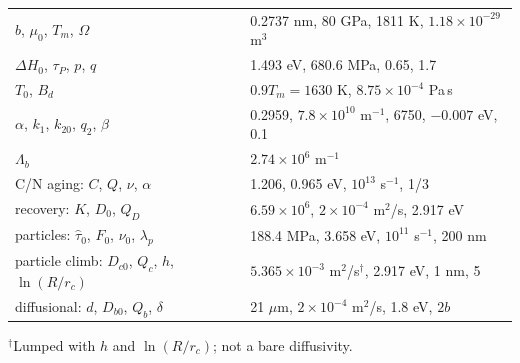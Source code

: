 \documentclass[11pt]{article}
\numberwithin{equation}{section}
\begin{document}
\begin{matbox}
\medskip
\begin{tabular}{@{}ll@{}}
\toprule
$b$, $\mu_0$, $T_m$, $\Omega$ & 0.2737 nm, 80 GPa, 1811 K, $1.18\times10^{-29}$ m$^3$\\
$\Delta H_0$, $\tau_P$, $p$, $q$ & 1.493 eV, 680.6 MPa, 0.65, 1.7\\
$T_0$, $B_d$ & $0.9T_m=1630$ K, $8.75\times10^{-4}$ Pa\,s\\
$\alpha$, $k_1$, $k_{20}$, $q_2$, $\beta$ & 0.2959, $7.8\times10^{10}$ m$^{-1}$, 6750, $-0.007$ eV, 0.1\\
$\Lambda_b$ & $2.74\times10^6$ m$^{-1}$\\
C/N aging: $C$, $Q$, $\nu$, $\alpha$ & 1.206, 0.965 eV, $10^{13}$ s$^{-1}$, 1/3\\
recovery: $K$, $D_0$, $Q_D$ & $6.59\times10^6$, $2\times10^{-4}$ m$^2$/s, 2.917 eV\\
particles: $\hat\tau_0$, $F_0$, $\nu_0$, $\lambda_p$ & 188.4 MPa, 3.658 eV, $10^{11}$ s$^{-1}$, 200 nm\\
particle climb: $D_{c0}$, $Q_c$, $h$, $\ln(R/r_c)$ & $5.365\times10^{-3}$ m$^2$/s$^\dagger$, 2.917 eV, 1 nm, 5\\
diffusional: $d$, $D_{b0}$, $Q_b$, $\delta$ & 21 $\mu$m, $2\times10^{-4}$ m$^2$/s, 1.8 eV, $2b$\\
\bottomrule
\end{tabular}

{\small $^\dagger$Lumped with $h$ and $\ln(R/r_c)$; not a bare diffusivity.}
\end{matbox}

\end{document}
